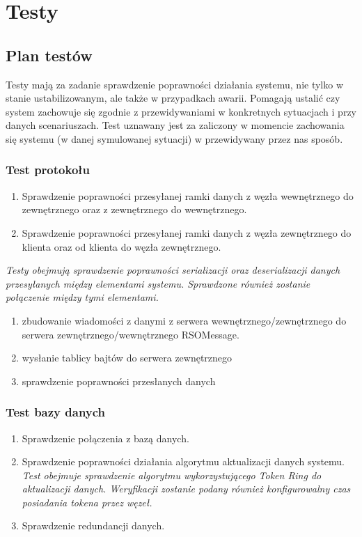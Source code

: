 \chapter{Testy}

\section{Plan testów}

Testy mają za zadanie sprawdzenie poprawności działania systemu, nie tylko w stanie ustabilizowanym, ale także w przypadkach awarii. Pomagają ustalić czy system zachowuje się zgodnie z przewidywaniami w konkretnych sytuacjach i przy danych scenariuszach. Test uznawany jest za zaliczony w momencie zachowania się systemu (w danej symulowanej sytuacji) w przewidywany przez nas sposób.

\subsection[Test protokołu]{Test protokołu}
\begin{enumerate}
\item Sprawdzenie poprawności przesyłanej ramki danych z węzła wewnętrznego do zewnętrznego oraz z zewnętrznego do wewnętrznego.
\item Sprawdzenie poprawności przesyłanej ramki danych z węzła zewnętrznego do klienta oraz od klienta do węzła zewnętrznego.
\end{enumerate}
	
\textit{Testy obejmują sprawdzenie poprawności serializacji oraz deserializacji danych przesyłanych między elementami systemu. Sprawdzone również zostanie połączenie między tymi elementami.}

\begin{enumerate}
\item zbudowanie wiadomości z danymi z serwera wewnętrznego/zewnętrznego do serwera zewnętrznego/wewnętrznego RSOMessage.
\item wysłanie tablicy bajtów do serwera zewnętrznego 
\item sprawdzenie poprawności przesłanych danych
\end{enumerate}


\subsection[Test bazy danych]{Test bazy danych}
\begin{enumerate}
\item Sprawdzenie połączenia z bazą danych.
\item Sprawdzenie poprawności działania algorytmu aktualizacji danych systemu. \\
\textit{Test obejmuje sprawdzenie algorytmu wykorzystującego Token Ring do aktualizacji danych. Weryfikacji zostanie podany również konfigurowalny czas posiadania tokena przez węzeł.}
\item Sprawdzenie redundancji danych.
\end{enumerate}

